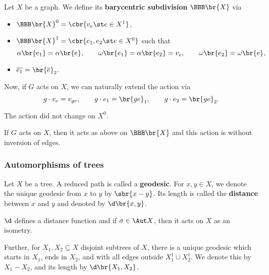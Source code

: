 \begin{definition}
Let $ X $ be a graph. We define its \textbf{barycentric subdivision} $ \BBB\br{X} $ via
\begin{itemize}
\item $ \BBB\br{X}^0 = \cbr{v_e \st e \in X^1} $,
\item $ \BBB\br{X}^1 = \cbr{e_1, e_2 \st e \in X^0} $ such that
$$ \alpha\br{e_1} = \alpha\br{e}, \qquad \omega\br{e_1} = \alpha\br{e_2} = v_e, \qquad \omega\br{e_2} = \omega\br{e}, $$
\item $ \overline{e_1} = \br{\overline{e}}_2 $.
\end{itemize}
\end{definition}

Now, if $ G $ acts on $ X $, we can naturally extend the action via
$$ g \cdot v_e = v_{ge}, \qquad g \cdot e_1 = \br{ge}_1, \qquad g \cdot e_2 = \br{ge}_2. $$

\begin{note*}
The action did not change on $ X^0 $.
\end{note*}

\begin{exercise}
If $ G $ acts on $ X $, then it acts as above on $ \BBB\br{X} $ and this action is without inversion of edges.
\end{exercise}

\subsubsection{Automorphisms of trees}

\begin{definition}
Let $ X $ be a tree. A reduced path is called a \textbf{geodesic}. For $ x, y \in X $, we denote the unique geodesic from $ x $ to $ y $ by $ \sbr{x - y} $. Its length is called the \textbf{distance} between $ x $ and $ y $ and denoted by $ \d\br{x, y} $.
\end{definition}

\begin{note*}
$ \d $ defines a distance function and if $ \sigma \in \Aut X $, then it acts on $ X $ as an isometry.
\end{note*}

\begin{note*}
Further, for $ X_1, X_2 \subseteq X $ disjoint subtrees of $ X $, there is a unique geodesic which starts in $ X_1 $, ends in $ X_2 $, and with all edges outside $ X_1^1 \cup X_2^1 $. We denote this by $ X_1 - X_2 $, and its length by $ \d\br{X_1, X_2} $.
\end{note*}

